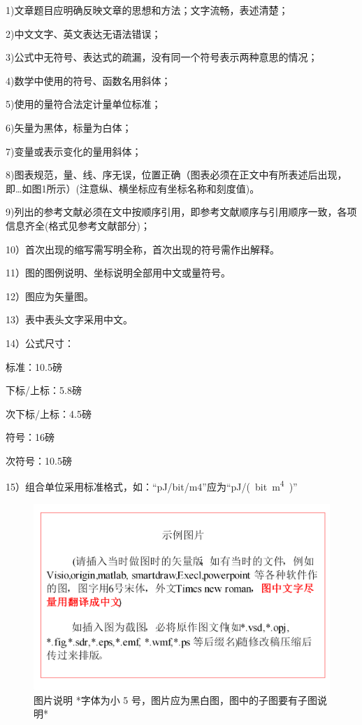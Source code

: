 \documentclass{cjc}
\begin{document}
1)文章题目应明确反映文章的思想和方法；文字流畅，表述清楚；

2)中文文字、英文表达无语法错误；

3)公式中无符号、表达式的疏漏，没有同一个符号表示两种意思的情况；

4)数学中使用的符号、函数名用斜体；

5)使用的量符合法定计量单位标准；

6)矢量为黑体，标量为白体；

7)变量或表示变化的量用斜体；

8)图表规范，量、线、序无误，位置正确（图表必须在正文中有所表述后出现，即…如图1所示）(注意纵、横坐标应有坐标名称和刻度值)。

9)列出的参考文献必须在文中按顺序引用，即参考文献顺序与引用顺序一致，各项信息齐全(格式见参考文献部分)；

10）首次出现的缩写需写明全称，首次出现的符号需作出解释。

11）图的图例说明、坐标说明全部用中文或量符号。

12）图应为矢量图。

13）表中表头文字采用中文。

14）公式尺寸：

标准：10.5磅

下标/上标：5.8磅

次下标/上标：4.5磅

符号：16磅

次符号：10.5磅

15）组合单位采用标准格式，如：“pJ/bit/m4”应为“\si{pJ/(bit.m^4)}”


\begin{figure}[htb]
  \centering
  \includegraphics[width=\linewidth]{img/example-fig.pdf}
  \caption{图片说明 *字体为小 5 号，图片应为黑白图，图中的子图要有子图说明*}\label{example-fig}
\end{figure}
\end{document}
